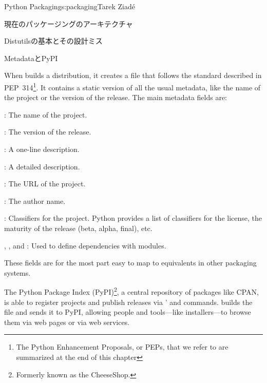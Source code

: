 \begin{aosachapter}{Python Packaging}{s:packaging}{Tarek Ziad\'{e}}
\begin{aosasect1}{現在のパッケージングのアーキテクチャ}
\begin{aosasect2}{Distutilsの基本とその設計ミス}
\end{aosasect2}

\begin{aosasect2}{MetadataとPyPI}

When  builds a distribution, it creates a
 file that follows the standard described in
PEP~314\footnote{The Python Enhancement Proposals, or PEPs, that we
refer to are summarized at the end of this chapter}.  It contains a
static version of all the usual metadata, like the name of the project
or the version of the release.  The main metadata fields are:

\begin{aosaitemize}

  \item {}: The name of the project.

  \item {}: The version of the release.

  \item {}: A one-line description.

  \item {}: A detailed description.

  \item {}: The URL of the project.

  \item {}: The author name.

  \item {}: Classifiers for the project. Python provides a list
  of classifiers for the license, the maturity of the release (beta,
  alpha, final), etc.

  \item {}, , and :
  Used to define dependencies with modules.

\end{aosaitemize}

\noindent
These fields are for the most part easy to map to equivalents in other
packaging systems.

The Python Package Index (PyPI)\footnote{Formerly known as the
CheeseShop.}, a central repository of packages like CPAN, is able to
register projects and publish releases via '
 and  commands.   builds
the  file and sends it to PyPI, allowing people and
tools---like installers---to browse them via web pages or via web
services.


\end{aosasect2}
\end{aosasect1}
\end{aosachapter}
